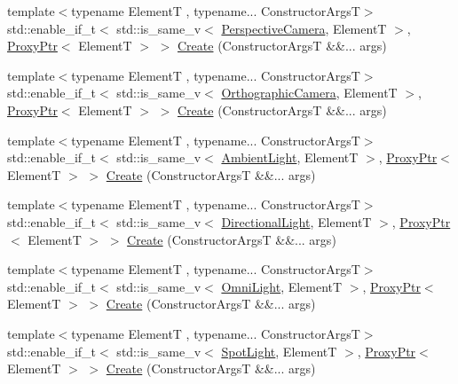 \begin{DoxyCompactItemize}
\item 
{\footnotesize template$<$typename ElementT , typename... Constructor\+ArgsT$>$ }\\std\+::enable\+\_\+if\+\_\+t$<$ std\+::is\+\_\+same\+\_\+v$<$ \hyperlink{classmage_1_1_perspective_camera}{Perspective\+Camera}, ElementT $>$, \hyperlink{classmage_1_1_proxy_ptr}{Proxy\+Ptr}$<$ ElementT $>$ $>$ \hyperlink{classmage_1_1_scene_afe0553fea0bb6d19cfd389402df083a3}{Create} (Constructor\+ArgsT \&\&... args)
\item 
{\footnotesize template$<$typename ElementT , typename... Constructor\+ArgsT$>$ }\\std\+::enable\+\_\+if\+\_\+t$<$ std\+::is\+\_\+same\+\_\+v$<$ \hyperlink{classmage_1_1_orthographic_camera}{Orthographic\+Camera}, ElementT $>$, \hyperlink{classmage_1_1_proxy_ptr}{Proxy\+Ptr}$<$ ElementT $>$ $>$ \hyperlink{classmage_1_1_scene_a0aa1fcb93706550b11ffbb547e5c977e}{Create} (Constructor\+ArgsT \&\&... args)
\item 
{\footnotesize template$<$typename ElementT , typename... Constructor\+ArgsT$>$ }\\std\+::enable\+\_\+if\+\_\+t$<$ std\+::is\+\_\+same\+\_\+v$<$ \hyperlink{classmage_1_1_ambient_light}{Ambient\+Light}, ElementT $>$, \hyperlink{classmage_1_1_proxy_ptr}{Proxy\+Ptr}$<$ ElementT $>$ $>$ \hyperlink{classmage_1_1_scene_a2484f1c345b669005feafaad710e3f2c}{Create} (Constructor\+ArgsT \&\&... args)
\item 
{\footnotesize template$<$typename ElementT , typename... Constructor\+ArgsT$>$ }\\std\+::enable\+\_\+if\+\_\+t$<$ std\+::is\+\_\+same\+\_\+v$<$ \hyperlink{classmage_1_1_directional_light}{Directional\+Light}, ElementT $>$, \hyperlink{classmage_1_1_proxy_ptr}{Proxy\+Ptr}$<$ ElementT $>$ $>$ \hyperlink{classmage_1_1_scene_af0e1e0cdd4d01ce9a07de2527bfde340}{Create} (Constructor\+ArgsT \&\&... args)
\item 
{\footnotesize template$<$typename ElementT , typename... Constructor\+ArgsT$>$ }\\std\+::enable\+\_\+if\+\_\+t$<$ std\+::is\+\_\+same\+\_\+v$<$ \hyperlink{classmage_1_1_omni_light}{Omni\+Light}, ElementT $>$, \hyperlink{classmage_1_1_proxy_ptr}{Proxy\+Ptr}$<$ ElementT $>$ $>$ \hyperlink{classmage_1_1_scene_ace6a5be772dfe8d1f07997a069468d57}{Create} (Constructor\+ArgsT \&\&... args)
\item 
{\footnotesize template$<$typename ElementT , typename... Constructor\+ArgsT$>$ }\\std\+::enable\+\_\+if\+\_\+t$<$ std\+::is\+\_\+same\+\_\+v$<$ \hyperlink{classmage_1_1_spot_light}{Spot\+Light}, ElementT $>$, \hyperlink{classmage_1_1_proxy_ptr}{Proxy\+Ptr}$<$ ElementT $>$ $>$ \hyperlink{classmage_1_1_scene_a2e1eb9d8c9fcc7d5722e4c499497d86f}{Create} (Constructor\+ArgsT \&\&... args)

\end{DoxyCompactItemize}
